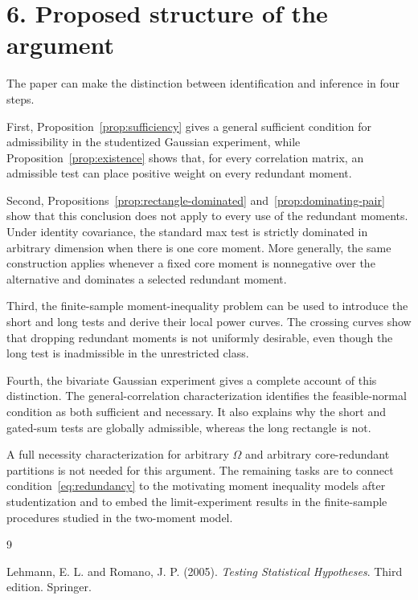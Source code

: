 \documentclass[12pt]{article}
\theoremstyle{remark}
\begin{document}
\section*{6. Proposed structure of the argument}

The paper can make the distinction between identification and inference in
four steps.

First, Proposition~\ref{prop:sufficiency} gives a general sufficient condition
for admissibility in the studentized Gaussian experiment, while
Proposition~\ref{prop:existence} shows that, for every correlation matrix, an
admissible test can place positive weight on every redundant moment.

Second, Propositions~\ref{prop:rectangle-dominated}
and~\ref{prop:dominating-pair} show that this conclusion does not apply to
every use of the redundant moments.  Under identity covariance, the standard
max test is strictly dominated in arbitrary dimension when there is one core
moment.  More generally, the same construction applies whenever a fixed core
moment is nonnegative over the alternative and dominates a selected redundant
moment.

Third, the finite-sample moment-inequality problem can be used to introduce
the short and long tests and derive their local power curves.  The crossing
curves show that dropping redundant moments is not uniformly desirable, even
though the long test is inadmissible in the unrestricted class.

Fourth, the bivariate Gaussian experiment gives a complete account of this
distinction.  The general-correlation characterization identifies the
feasible-normal condition as both sufficient and necessary.  It also explains
why the short and gated-sum tests are globally admissible, whereas the long
rectangle is not.

A full necessity characterization for arbitrary $\Omega$ and arbitrary
core-redundant partitions is not needed for this argument.  The remaining
tasks are to connect condition~\eqref{eq:redundancy} to the motivating moment
inequality models after studentization and to embed the limit-experiment
results in the finite-sample procedures studied in the two-moment model.

\begin{thebibliography}{9}

Lehmann, E. L. and Romano, J. P. (2005).
\textit{Testing Statistical Hypotheses}. Third edition. Springer.

\end{thebibliography}
\end{document}

